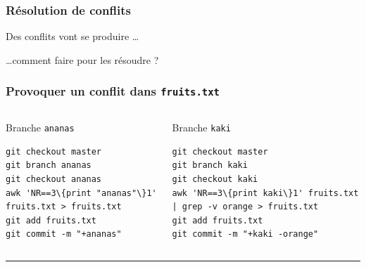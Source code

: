 \documentclass[table,tikz,12pt,svgnames]{beamer}
\begin{document}
\begin{frame}
\frametitle{Résolution de conflits}
\begin{block}{Des conflits vont se produire \ldots}
\end{block}
\begin{block}{\ldots comment faire pour les résoudre ?}
\end{block}
\end{frame}


\begin{frame}[fragile]
\frametitle{Provoquer un conflit dans \texttt{fruits.txt}}
\vspace{-0.2em}
\begin{adjustwidth}{-0.6cm}{-0.6cm}{}
\begin{columns}[T] %
	\begin{column}{.55\textwidth}
		\color{darkgreen}
		Branche \texttt{ananas}
		\color{black}
		\begin{verbatim}
git checkout master
git branch ananas
git checkout ananas
awk 'NR==3\{print "ananas"\}1' fruits.txt > fruits.txt
git add fruits.txt
git commit -m "+ananas"
		\end{verbatim}
	\end{column}%
	\hfill%
	\begin{column}{.52\textwidth}
		\vspace{-0.2em}
		\color{blue}%
		Branche \texttt{kaki}
		\color{black}
		\vspace{-0.3em}
\begin{verbatim}
git checkout master
git branch kaki
git checkout kaki
awk 'NR==3\{print kaki\}1' fruits.txt | grep -v orange > fruits.txt
git add fruits.txt
git commit -m "+kaki -orange"
\end{verbatim}
\end{column}%
\end{columns}
\end{adjustwidth}

\color{gray}\rule{\linewidth}{3pt}
\color{black}
\vspace{-0.82em}


\end{frame}
\end{document}
